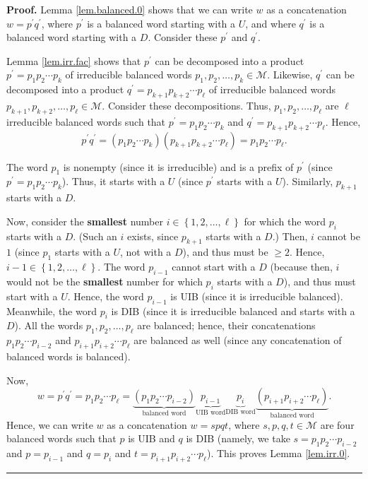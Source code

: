 \documentclass[numbers=enddot,12pt,final,onecolumn,notitlepage]{scrartcl}%
\theoremstyle{definition}
\newenvironment{proof}[1][Proof]{\noindent\textbf{#1.} }{\ \rule{0.5em}{0.5em}}
\newcommand{\M}{\mathcal{M}}
\begin{document}
\begin{proof}
Lemma \ref{lem.balanced.0} shows that we can write $w$ as a concatenation
$w=p^{\prime}q^{\prime}$, where $p^{\prime}$ is a balanced word starting with
a $U$, and where $q^{\prime}$ is a balanced word starting with a $D$. Consider
these $p^{\prime}$ and $q^{\prime}$.

Lemma \ref{lem.irr.fac} shows that $p^{\prime}$ can be decomposed into a
product $p^{\prime}=p_{1}p_{2}\cdots p_{k}$ of irreducible balanced words
$p_{1},p_{2},\ldots,p_{k}\in\M$. Likewise, $q^{\prime}$ can be
decomposed into a product $q^{\prime}=p_{k+1}p_{k+2}\cdots p_{\ell}$ of
irreducible balanced words $p_{k+1},p_{k+2},\ldots,p_{\ell}\in\M$.
Consider these decompositions. Thus, $p_{1},p_{2},\ldots,p_{\ell}$ are $\ell$
irreducible balanced words such that $p^{\prime}=p_{1}p_{2}\cdots p_{k}$ and
$q^{\prime}=p_{k+1}p_{k+2}\cdots p_{\ell}$. Hence,%
\[
p^{\prime}q^{\prime}=\left(  p_{1}p_{2}\cdots p_{k}\right)  \left(
p_{k+1}p_{k+2}\cdots p_{\ell}\right)  =p_{1}p_{2}\cdots p_{\ell}.
\]


The word $p_{1}$ is nonempty (since it is irreducible) and is a prefix of
$p^{\prime}$ (since $p^{\prime}=p_{1}p_{2}\cdots p_{k}$). Thus, it starts with
a $U$ (since $p^{\prime}$ starts with a $U$). Similarly, $p_{k+1}$ starts with
a $D$.

Now, consider the \textbf{smallest} number $i\in\left\{  1,2,\ldots
,\ell\right\}  $ for which the word $p_{i}$ starts with a $D$. (Such an $i$
exists, since $p_{k+1}$ starts with a $D$.) Then, $i$ cannot be $1$ (since
$p_{1}$ starts with a $U$, not with a $D$), and thus must be $\geq2$. Hence,
$i-1\in\left\{  1,2,\ldots,\ell\right\}  $. The word $p_{i-1}$ cannot start
with a $D$ (because then, $i$ would not be the \textbf{smallest} number for
which $p_{i}$ starts with a $D$), and thus must start with a $U$. Hence, the
word $p_{i-1}$ is UIB (since it is irreducible balanced). Meanwhile, the word
$p_{i}$ is DIB (since it is irreducible balanced and starts with a $D$). All
the words $p_{1},p_{2},\ldots,p_{\ell}$ are balanced; hence, their
concatenations $p_{1}p_{2}\cdots p_{i-2}$ and $p_{i+1}p_{i+2}\cdots p_{\ell}$
are balanced as well (since any concatenation of balanced words is balanced).

Now,%
\[
w=p^{\prime}q^{\prime}=p_{1}p_{2}\cdots p_{\ell}=\underbrace{\left(
p_{1}p_{2}\cdots p_{i-2}\right)  }_{\text{balanced word}}\underbrace{p_{i-1}%
}_{\text{UIB word}}\underbrace{p_{i}}_{\text{DIB word}}\underbrace{\left(
p_{i+1}p_{i+2}\cdots p_{\ell}\right)  }_{\text{balanced word}}.
\]
Hence, we can write $w$ as a concatenation $w=spqt$, where $s,p,q,t\in
\M$ are four balanced words such that $p$ is UIB and $q$ is DIB
(namely, we take $s=p_{1}p_{2}\cdots p_{i-2}$ and $p=p_{i-1}$ and $q=p_{i}$
and $t=p_{i+1}p_{i+2}\cdots p_{\ell}$). This proves Lemma \ref{lem.irr.0}.
\end{proof}
\end{document}
